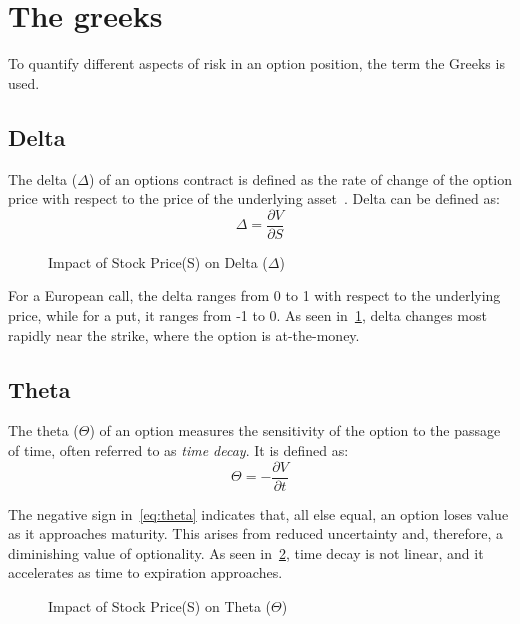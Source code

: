 \documentclass[11pt]{report}
\begin{document}
\section{The greeks}
To quantify different aspects of risk in an option position, the term the Greeks is used. 
\subsection{Delta}
The delta ($\Delta$) of an options
contract is defined as the rate of change of the option 
price with respect to the price of the underlying 
asset~\cite{alma991008589012108046}. Delta can be defined as:
\begin{equation}
   \Delta =  \frac{\partial V}{\partial S}
\end{equation}
\begin{figure}[htbp]
    \centering
    \scalebox{0.72}{}
    \caption{Impact of Stock Price(S) on Delta ($\Delta$)}
    \label{fig:delta_greek}
\end{figure}
For a European call, the delta ranges from 0 to 1 with respect 
to the underlying price, while for a put, it ranges from -1 to 0. 
As seen in~\ref{fig:delta_greek}, delta changes most rapidly near the strike, 
where the option is at-the-money.

\subsection{Theta}
The theta ($\Theta$) of an option measures the sensitivity of the option to the passage of time, often referred to as \textit{time decay}. It is defined as:
\begin{equation}
    \Theta = - \frac{\partial V}{\partial t}
     \label{eq:theta}
\end{equation}

The negative sign in~\ref{eq:theta} indicates that, 
all else equal, an option loses value as it approaches maturity. 
This arises from reduced uncertainty and, therefore, a 
diminishing value of optionality. As seen in~\ref{fig:theta_greeks}, 
time decay is not linear, and it accelerates as time to expiration approaches. 

\begin{figure}[H]
    \centering
    \scalebox{0.72}{}
    \caption{Impact of Stock Price(S) on Theta ($\Theta$)}
    \label{fig:theta_greeks}
\end{figure}
\end{document}
